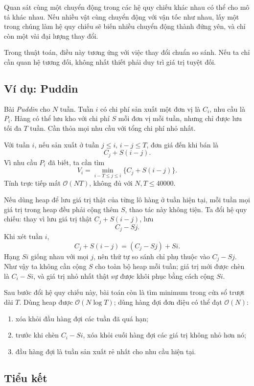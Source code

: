 \documentclass[11pt]{article}
\newcommand{\Oh}{\mathcal{O}}
\begin{document}
Quan sát cùng một chuyển động trong các hệ quy chiếu khác nhau có thể cho mô
tả khác nhau. Nếu nhiều vật cùng chuyển động với vận tốc như nhau, lấy một
trong chúng làm hệ quy chiếu sẽ biến nhiều chuyển động thành đứng yên, và chỉ
còn một vài đại lượng thay đổi.

Trong thuật toán, điều này tương ứng với việc thay đổi chuẩn so sánh. Nếu ta
chỉ cần quan hệ tương đối, không nhất thiết phải duy trì giá trị tuyệt đối.

\subsection{Ví dụ: Puddin}

Bài \textit{Puddin} cho \(N\) tuần. Tuần \(i\) có chi phí sản xuất một đơn vị
là \(C_i\), nhu cầu là \(P_i\). Hàng có thể lưu kho với chi phí \(S\) mỗi đơn
vị mỗi tuần, nhưng chỉ được lưu tối đa \(T\) tuần. Cần thỏa mọi nhu cầu với
tổng chi phí nhỏ nhất.

Với tuần \(i\), nếu sản xuất ở tuần \(j\le i\), \(i-j\le T\), đơn giá đến khi
bán là
\[
  C_j+S(i-j).
\]
Vì nhu cầu \(P_i\) đã biết, ta cần tìm
\[
  V_i=\min_{i-T\le j\le i}\{C_j+S(i-j)\}.
\]
Tính trực tiếp mất \(\Oh(NT)\), không đủ với \(N,T\le40000\).

Nếu dùng heap để lưu giá trị thật của từng lô hàng ở tuần hiện tại, mỗi tuần
mọi giá trị trong heap đều phải cộng thêm \(S\), thao tác này không tiện. Ta
đổi hệ quy chiếu: thay vì lưu giá trị thật \(C_j+S(i-j)\), lưu
\[
  C_j-Sj.
\]
Khi xét tuần \(i\),
\[
  C_j+S(i-j)=(C_j-Sj)+Si.
\]
Hạng \(Si\) giống nhau với mọi \(j\), nên thứ tự so sánh chỉ phụ thuộc vào
\(C_j-Sj\). Như vậy ta không cần cộng \(S\) cho toàn bộ heap mỗi tuần; giá trị
mới được chèn là \(C_i-Si\), và giá trị nhỏ nhất thật sự được khôi phục bằng
cách cộng \(Si\).

Sau bước đổi hệ quy chiếu này, bài toán còn là tìm minimum trong cửa sổ trượt
dài \(T\). Dùng heap được \(\Oh(N\log T)\); dùng hàng đợi đơn điệu có thể đạt
\(\Oh(N)\):
\begin{enumerate}
  \item xóa khỏi đầu hàng đợi các tuần đã quá hạn;
  \item trước khi chèn \(C_i-Si\), xóa khỏi cuối hàng đợi các giá trị không
  nhỏ hơn nó;
  \item đầu hàng đợi là tuần sản xuất rẻ nhất cho nhu cầu hiện tại.
\end{enumerate}

\subsection{Tiểu kết}
\end{document}
